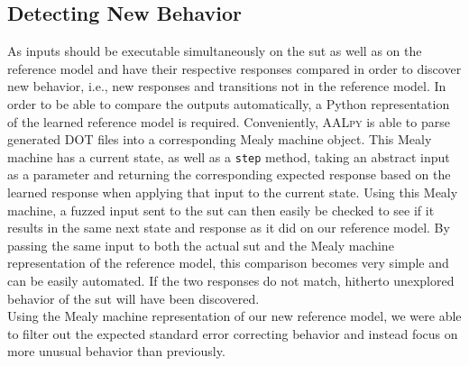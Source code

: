 \subsection{Detecting New Behavior} \label{subsec:state_detect}
As inputs should be executable simultaneously on the \ac{sut} as well as on the reference model and have their respective responses compared in order to discover new behavior, i.e., new responses and transitions not in the reference model. In order to be able to compare the outputs automatically, a Python representation of the learned reference model is required. Conveniently, \textsc{AALpy} is able to parse generated DOT files into a corresponding Mealy machine object. This Mealy machine has a current state, as well as a \texttt{step} method, taking an abstract input as a parameter and returning the corresponding expected response based on the learned response when applying that input to the current state. Using this Mealy machine, a fuzzed input sent to the \ac{sut} can then easily be checked to see if it results in the same next state and response as it did on our reference model. By passing the same input to both the actual \ac{sut} and the Mealy machine representation of the reference model, this comparison becomes very simple and can be easily automated. If the two responses do not match, hitherto unexplored behavior of the \ac{sut} will have been discovered. \\

Using the Mealy machine representation of our new reference model, we were able to filter out the expected standard error correcting behavior and instead focus on more unusual behavior than previously. 

\newpage
